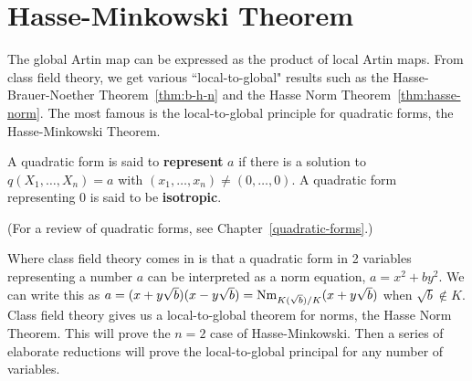 \section{Hasse-Minkowski Theorem}
The global Artin map can be expressed as the product of local Artin maps. From class field theory, we get various ``local-to-global" results such as the Hasse-Brauer-Noether Theorem~\ref{thm:b-h-n} and the Hasse Norm Theorem~\ref{thm:hasse-norm}. The most famous is the local-to-global principle for quadratic forms, the Hasse-Minkowski Theorem.
\begin{df}
A quadratic form is said to \textbf{represent} $a$ if there is a solution to $q(X_1,\ldots, X_n)=a$ with $(x_1,\ldots, x_n)\ne (0,\ldots, 0)$. %
A quadratic form representing 0 is said to be \textbf{isotropic}.
\end{df} 
(For a review of quadratic forms, see Chapter~\ref{quadratic-forms}.) 

Where class field theory comes in is that a quadratic form in 2 variables representing a number $a$ can be interpreted as a norm equation, $a=x^2+by^2$. We can write this as $a=(x+y\sqrt b)(x-y\sqrt b)=\operatorname{Nm}_{K(\sqrt b)/K}(x+y\sqrt b)$ when $\sqrt b\nin K$. Class field theory gives us a local-to-global theorem for norms, the Hasse Norm Theorem. This will prove the $n=2$ case of Hasse-Minkowski. Then a series of elaborate reductions will prove the local-to-global principal for any number of variables.
